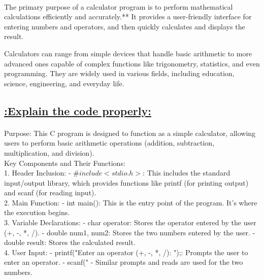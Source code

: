 \documentclass[a4paper,12pt]{article}
\begin{document}
\paragraph{}
The primary purpose of a calculator program is to perform mathematical calculations efficiently and accurately.** It provides a user-friendly interface for entering numbers and operators, and then quickly calculates and displays the result. 

Calculators can range from simple devices that handle basic arithmetic to more advanced ones capable of complex functions like trigonometry, statistics, and even programming. They are widely used in various fields, including education, science, engineering, and everyday life.



\begin{center}
\section*{\uline{:Explain the code properly:}}
\end{center}

\paragraph{}

Purpose:
This C program is designed to function as a simple calculator, allowing users to perform basic arithmetic operations (addition, subtraction, multiplication, and division).\\

Key Components and Their Functions:\\

1. Header Inclusion:
   - $\#include <stdio.h>$: This includes the standard input/output library, which provides functions like printf (for printing output) and scanf (for reading input).\\

2. Main Function:
   - int main(): This is the entry point of the program. It's where the execution begins.\\

3. Variable Declarations:
   - char operator: Stores the operator entered by the user (+, -, *, /).
   - double num1, num2: Stores the two numbers entered by the user.
   - double result: Stores the calculated result.\\

4. User Input:
   - printf("Enter an operator (+, -, *, /): ");: Prompts the user to enter an operator.
   - scanf("%
   - Similar prompts and reads are used for the two numbers.\\
\end{document}
